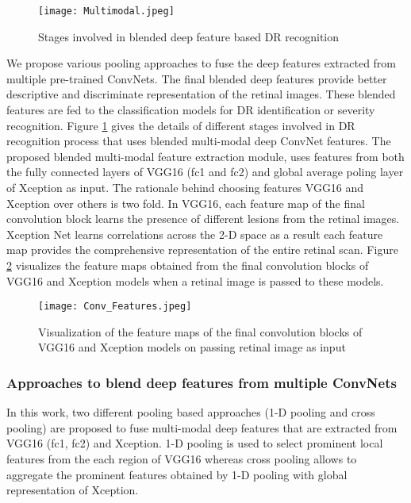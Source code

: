 \documentclass[electronics,article,accept ,moreauthors,pdftex]{mdpi}
\begin{document}
\begin{figure}[H]
    \center
    \texttt{[image: Multimodal.jpeg]}
    \caption{Stages involved in blended  deep feature based DR recognition}
    \label{fig:Multimodal}
\end{figure}
We propose various pooling approaches to fuse the deep features extracted from multiple pre-trained ConvNets. The final blended deep features provide better descriptive and discriminate representation of the retinal images. These blended features are fed to the classification models for DR identification or severity recognition. Figure \ref{fig:Multimodal} gives the details of different stages involved in DR recognition process that uses blended multi-modal deep ConvNet features.
The proposed blended multi-modal feature extraction module, uses features from both the fully connected layers of VGG16 (fc1 and fc2) and global average poling layer of Xception as input. 
The rationale behind choosing features VGG16 and Xception over others is two fold. 
In VGG16, each feature map of the final  convolution block learns the presence of different lesions from the retinal images.  Xception Net learns correlations across the 2-D space as a result each feature map provides  the comprehensive representation of the entire retinal scan. Figure \ref{fig:Convmaps} visualizes the feature maps obtained from the final convolution blocks of VGG16 and Xception models when a retinal image is passed to these models.


\begin{figure}[H]
    \center
    \texttt{[image: Conv\_Features.jpeg]}
    \caption{Visualization of the feature maps of the final convolution blocks of VGG16 and Xception models on passing retinal image as input}
    \label{fig:Convmaps}
\end{figure}

\subsubsection{Approaches to blend deep features from multiple ConvNets}
In this work, two different pooling based approaches (1-D pooling and cross pooling) are proposed to fuse multi-modal deep features that are extracted from VGG16 (fc1, fc2) and Xception. 1-D pooling is used to select  prominent local features from the each region of VGG16 whereas cross pooling allows to aggregate the prominent features obtained by 1-D pooling with global representation of Xception. 
\end{document}
